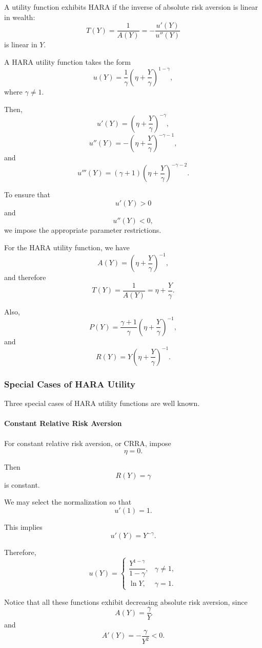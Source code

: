 A utility function exhibits HARA if the inverse of absolute risk aversion is linear in wealth:
\[
T(Y)
=
\frac{1}{A(Y)}
=
-\frac{u'(Y)}{u''(Y)}
\]
is linear in \(Y\).

A HARA utility function takes the form
\[
u(Y)
=
\frac{1}{\gamma}
\left(
\eta+\frac{Y}{\gamma}
\right)^{1-\gamma},
\]
where \(\gamma\neq 1\).

Then,
\[
u'(Y)
=
\left(
\eta+\frac{Y}{\gamma}
\right)^{-\gamma},
\]
\[
u''(Y)
=
-
\left(
\eta+\frac{Y}{\gamma}
\right)^{-\gamma-1},
\]
and
\[
u'''(Y)
=
(\gamma+1)
\left(
\eta+\frac{Y}{\gamma}
\right)^{-\gamma-2}.
\]



To ensure that
\[
u'(Y)>0
\]
and
\[
u''(Y)<0,
\]
we impose the appropriate parameter restrictions.

For the HARA utility function, we have
\[
A(Y)
=
\left(
\eta+\frac{Y}{\gamma}
\right)^{-1},
\]
and therefore
\[
T(Y)
=
\frac{1}{A(Y)}
=
\eta+\frac{Y}{\gamma}.
\]

Also,
\[
P(Y)
=
\frac{\gamma+1}{\gamma}
\left(
\eta+\frac{Y}{\gamma}
\right)^{-1},
\]
and
\[
R(Y)
=
Y
\left(
\eta+\frac{Y}{\gamma}
\right)^{-1}.
\]

\subsubsection{Special Cases of HARA Utility}

Three special cases of HARA utility functions are well known.

\paragraph{Constant Relative Risk Aversion}

For constant relative risk aversion, or CRRA, impose
\[
\eta=0.
\]

Then
\[
R(Y)=\gamma
\]
is constant.

We may select the normalization so that
\[
u'(1)=1.
\]

This implies
\[
u'(Y)=Y^{-\gamma}.
\]

Therefore,
\[
u(Y)
=
\begin{cases}
\dfrac{Y^{1-\gamma}}{1-\gamma}, & \gamma\ne 1,\\[1em]
\ln Y, & \gamma=1.
\end{cases}
\]

Notice that all these functions exhibit decreasing absolute risk aversion, since
\[
A(Y)=\frac{\gamma}{Y}
\]
and
\[
A'(Y)
=
-\frac{\gamma}{Y^2}<0.
\]

